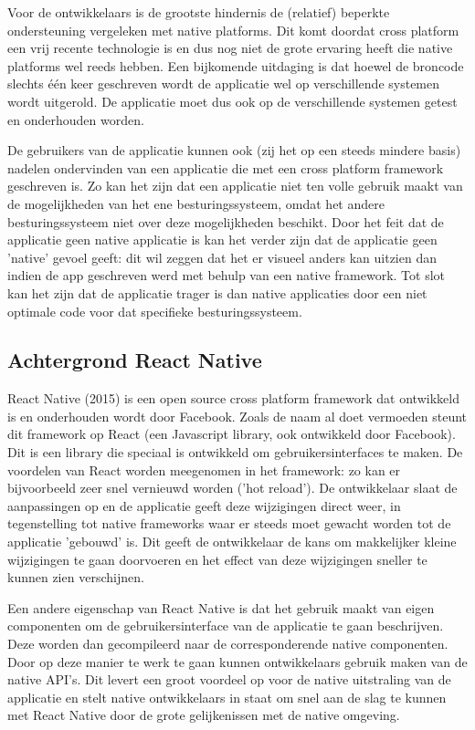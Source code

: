 Voor de ontwikkelaars is de grootste hindernis de (relatief) beperkte ondersteuning vergeleken met native platforms. Dit komt doordat cross platform een vrij recente technologie is en dus nog niet de grote ervaring heeft die native platforms wel reeds hebben. Een bijkomende uitdaging is dat hoewel de broncode slechts één keer geschreven wordt de applicatie wel op verschillende systemen wordt uitgerold. De applicatie moet dus ook op de verschillende systemen getest en onderhouden worden.

De gebruikers van de applicatie kunnen ook (zij het op een steeds mindere basis) nadelen ondervinden van een applicatie die met een cross platform framework geschreven is. Zo kan het zijn dat een applicatie niet ten volle gebruik maakt van de mogelijkheden van het ene besturingssysteem, omdat het andere besturingssysteem niet over deze mogelijkheden beschikt. Door het feit dat de applicatie geen native applicatie is kan het verder zijn dat de applicatie geen 'native' gevoel geeft: dit wil zeggen dat het er visueel anders kan uitzien dan indien de app geschreven werd met behulp van een native framework. Tot slot kan het zijn dat de applicatie trager is dan native applicaties door een niet optimale code voor dat specifieke besturingssysteem.

\subsection{Achtergrond React Native}

React Native (2015) is een open source cross platform framework dat ontwikkeld is en onderhouden wordt door Facebook. Zoals de naam al doet vermoeden steunt dit framework op React (een Javascript library, ook ontwikkeld door Facebook). Dit is een library die speciaal is ontwikkeld om gebruikersinterfaces te maken. De voordelen van React worden meegenomen in het framework: zo kan er bijvoorbeeld zeer snel vernieuwd worden ('hot reload'). De ontwikkelaar slaat de aanpassingen op en de applicatie geeft deze wijzigingen direct weer, in tegenstelling tot native frameworks waar er steeds moet gewacht worden tot de applicatie 'gebouwd' is. Dit geeft de ontwikkelaar de kans om makkelijker kleine wijzigingen te gaan doorvoeren en het effect van deze wijzigingen sneller te kunnen zien verschijnen.

Een andere eigenschap van React Native is dat het gebruik maakt van eigen componenten om de gebruikersinterface van de applicatie te gaan beschrijven. Deze worden dan gecompileerd naar de corresponderende native componenten. Door op deze manier te werk te gaan kunnen ontwikkelaars gebruik maken van de native API's. Dit levert een groot voordeel op voor de native uitstraling van de applicatie en stelt native ontwikkelaars in staat om snel aan de slag te kunnen met React Native door de grote gelijkenissen met de native omgeving.

